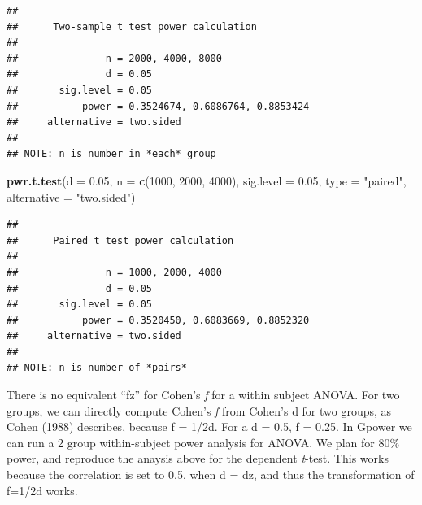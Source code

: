 \documentclass[]{book}
\newenvironment{Shaded}{\begin{snugshade}}{\end{snugshade}}
\newcommand{\DataTypeTok}[1]{\textcolor[rgb]{0.13,0.29,0.53}{#1}}
\newcommand{\DecValTok}[1]{\textcolor[rgb]{0.00,0.00,0.81}{#1}}
\newcommand{\FloatTok}[1]{\textcolor[rgb]{0.00,0.00,0.81}{#1}}
\newcommand{\KeywordTok}[1]{\textcolor[rgb]{0.13,0.29,0.53}{\textbf{#1}}}
\newcommand{\NormalTok}[1]{#1}
\newcommand{\StringTok}[1]{\textcolor[rgb]{0.31,0.60,0.02}{#1}}
\begin{document}
\begin{verbatim}
## 
##      Two-sample t test power calculation 
## 
##               n = 2000, 4000, 8000
##               d = 0.05
##       sig.level = 0.05
##           power = 0.3524674, 0.6086764, 0.8853424
##     alternative = two.sided
## 
## NOTE: n is number in *each* group
\end{verbatim}

\begin{Shaded}
\begin{Highlighting}[]
\KeywordTok{pwr.t.test}\NormalTok{(}\DataTypeTok{d =} \FloatTok{0.05}\NormalTok{,}
           \DataTypeTok{n =} \KeywordTok{c}\NormalTok{(}\DecValTok{1000}\NormalTok{, }\DecValTok{2000}\NormalTok{, }\DecValTok{4000}\NormalTok{),}
           \DataTypeTok{sig.level =} \FloatTok{0.05}\NormalTok{,}
           \DataTypeTok{type =} \StringTok{"paired"}\NormalTok{,}
           \DataTypeTok{alternative =} \StringTok{"two.sided"}\NormalTok{)}
\end{Highlighting}
\end{Shaded}

\begin{verbatim}
## 
##      Paired t test power calculation 
## 
##               n = 1000, 2000, 4000
##               d = 0.05
##       sig.level = 0.05
##           power = 0.3520450, 0.6083669, 0.8852320
##     alternative = two.sided
## 
## NOTE: n is number of *pairs*
\end{verbatim}

There is no equivalent ``fz'' for Cohen's \emph{f} for a within subject ANOVA. For two groups, we can directly compute Cohen's \emph{f} from Cohen's d for two groups, as Cohen (1988) describes, because f = 1/2d. For a d = 0.5, f = 0.25. In Gpower we can run a 2 group within-subject power analysis for ANOVA. We plan for 80\% power, and reproduce the anaysis above for the dependent \emph{t}-test. This works because the correlation is set to 0.5, when d = dz, and thus the transformation of f=1/2d works.
\end{document}
